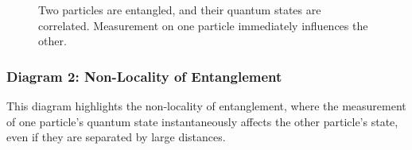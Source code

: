 \documentclass[12pt]{article}
\begin{document}
\begin{figure}[H]

\caption{Two particles are entangled, and their quantum states are correlated. Measurement on one particle immediately influences the other.}
\end{figure}

\subsubsection*{Diagram 2: Non-Locality of Entanglement}

This diagram highlights the non-locality of entanglement, where the measurement of one particle’s quantum state instantaneously affects the other particle’s state, even if they are separated by large distances.
\end{document}
